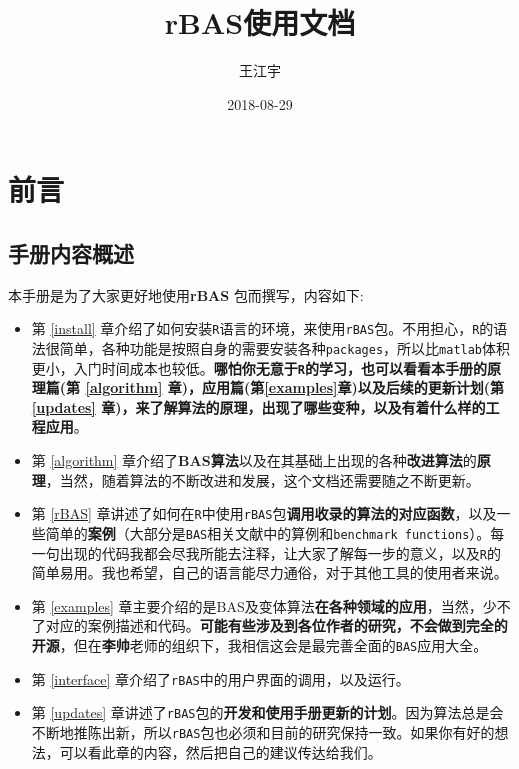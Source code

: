 \documentclass[]{ctexbook}
\title{rBAS使用文档}
\author{王江宇}
\date{2018-08-29}
\theoremstyle{definition}
\theoremstyle{definition}
\theoremstyle{definition}
\theoremstyle{remark}
\begin{document}
\maketitle

{
\setcounter{tocdepth}{2}
\tableofcontents
}
\listoftables
\listoffigures
\mainmatter

\chapter*{前言}


\section*{手册内容概述}


本手册是为了大家更好地使用\textbf{rBAS}
\citep{R-rBAS}包而撰写，内容如下:

\begin{itemize}
\item
  第 \ref{install}
  章介绍了如何安装\texttt{R}语言的环境，来使用\texttt{rBAS}包。不用担心，\texttt{R}的语法很简单，各种功能是按照自身的需要安装各种\texttt{packages}，所以比\texttt{matlab}体积更小，入门时间成本也较低。\textbf{哪怕你无意于\texttt{R}的学习，也可以看看本手册的原理篇(第
  \ref{algorithm} 章)，应用篇(第\ref{examples}章)以及后续的更新计划(第
  \ref{updates}
  章)，来了解算法的原理，出现了哪些变种，以及有着什么样的工程应用}。
\item
  第 \ref{algorithm}
  章介绍了\textbf{BAS算法}以及在其基础上出现的各种\textbf{改进算法}的\textbf{原理}，当然，随着算法的不断改进和发展，这个文档还需要随之不断更新。
\item
  第 \ref{rBAS}
  章讲述了如何在\texttt{R}中使用\texttt{rBAS}包\textbf{调用收录的算法的对应函数}，以及一些简单的\textbf{案例}（大部分是\texttt{BAS}相关文献中的算例和\texttt{benchmark\ functions}）。每一句出现的代码我都会尽我所能去注释，让大家了解每一步的意义，以及\texttt{R}的简单易用。我也希望，自己的语言能尽力通俗，对于其他工具的使用者来说。
\item
  第 \ref{examples}
  章主要介绍的是BAS及变体算法\textbf{在各种领域的应用}，当然，少不了对应的案例描述和代码。\textbf{可能有些涉及到各位作者的研究，不会做到完全的开源}，但在\textbf{李帅}老师的组织下，我相信这会是最完善全面的\texttt{BAS}应用大全。
\item
  第 \ref{interface} 章介绍了\texttt{rBAS}中的用户界面的调用，以及运行。
\item
  第 \ref{updates}
  章讲述了\texttt{rBAS}包的\textbf{开发和使用手册更新的计划}。因为算法总是会不断地推陈出新，所以\texttt{rBAS}包也必须和目前的研究保持一致。如果你有好的想法，可以看此章的内容，然后把自己的建议传达给我们。
\end{itemize}
\end{document}
